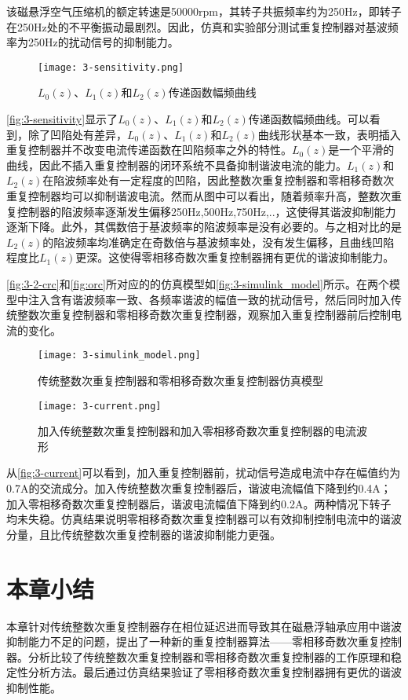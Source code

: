 该磁悬浮空气压缩机的额定转速是50000rpm，其转子共振频率约为250Hz，即转子在250Hz处的不平衡振动最剧烈。因此，仿真和实验部分测试重复控制器对基波频率为250Hz的扰动信号的抑制能力。
\begin{figure}
	\texttt{[image: 3-sensitivity.png]}
	\caption{$L_0(z)$、$L_1(z)$和$L_2(z)$传递函数幅频曲线}
	\label{fig:3-sensitivity}
\end{figure}

\autoref{fig:3-sensitivity}显示了$L_0(z)$、$L_1(z)$和$L_2(z)$传递函数幅频曲线。可以看到，除了凹陷处有差异，$L_0(z)$、$L_1(z)$和$L_2(z)$曲线形状基本一致，表明插入重复控制器并不改变电流传递函数在凹陷频率之外的特性。$L_0(z)$是一个平滑的曲线，因此不插入重复控制器的闭环系统不具备抑制谐波电流的能力。$L_1(z)$和$L_2(z)$在陷波频率处有一定程度的凹陷，因此整数次重复控制器和零相移奇数次重复控制器均可以抑制谐波电流。然而从图中可以看出，随着频率升高，整数次重复控制器的陷波频率逐渐发生偏移250Hz,500Hz,750Hz,..，这使得其谐波抑制能力逐渐下降。此外，其偶数倍于基波频率的陷波频率是没有必要的。与之相对比的是$L_2(z)$的陷波频率均准确定在奇数倍与基波频率处，没有发生偏移，且曲线凹陷程度比$L_1(z)$更深。这使得零相移奇数次重复控制器拥有更优的谐波抑制能力。

\autoref{fig:3-2-crc}和\autoref{fig:orc}所对应的的仿真模型如\autoref{fig:3-simulink_model}所示。在两个模型中注入含有谐波频率一致、各频率谐波的幅值一致的扰动信号，然后同时加入传统整数次重复控制器和零相移奇数次重复控制器，观察加入重复控制器前后控制电流的变化。
\begin{figure}
	\texttt{[image: 3-simulink\_model.png]}
	\caption{传统整数次重复控制器和零相移奇数次重复控制器仿真模型}
	\label{fig:3-simulink_model}
\end{figure}

\begin{figure}
	\texttt{[image: 3-current.png]}
	\caption{加入传统整数次重复控制器和加入零相移奇数次重复控制器的电流波形}
	\label{fig:3-current}
\end{figure}

从\autoref{fig:3-current}可以看到，加入重复控制器前，扰动信号造成电流中存在幅值约为0.7A的交流成分。加入传统整数次重复控制器后，谐波电流幅值下降到约0.4A；加入零相移奇数次重复控制器后，谐波电流幅值下降到约0.2A。两种情况下转子均未失稳。仿真结果说明零相移奇数次重复控制器可以有效抑制控制电流中的谐波分量，且比传统整数次重复控制器的谐波抑制能力更强。
\section{本章小结}
本章针对传统整数次重复控制器存在相位延迟进而导致其在磁悬浮轴承应用中谐波抑制能力不足的问题，提出了一种新的重复控制器算法——零相移奇数次重复控制器。分析比较了传统整数次重复控制器和零相移奇数次重复控制器的工作原理和稳定性分析方法。最后通过仿真结果验证了零相移奇数次重复控制器拥有更优的谐波抑制性能。
